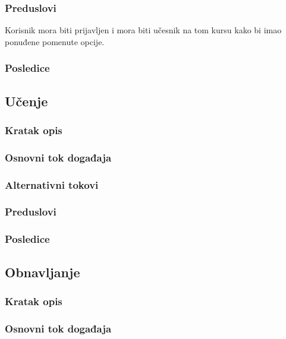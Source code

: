 \subsubsection{Preduslovi}
Korisnik mora biti prijavljen i mora biti učesnik na tom kursu kako bi imao ponuđene pomenute opcije.
\subsubsection{Posledice}



\subsection{Učenje}
\label{subsec:ucenje}

\subsubsection{Kratak opis}

\subsubsection{Osnovni tok događaja}

\subsubsection{Alternativni tokovi}

\subsubsection{Preduslovi}

\subsubsection{Posledice}




\subsection{Obnavljanje}
\label{subsec:obnavljanje}

\subsubsection{Kratak opis}

\subsubsection{Osnovni tok događaja}

